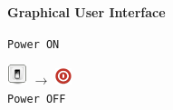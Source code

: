 \documentclass{beamer}
\begin{document}
\begin{frame}
\begin{center}
\begin{block}{\textbf{{\small Graphical User Interface}}}
\begin{minipage}{0.17\textwidth}
\begin{center}
					{\footnotesize \texttt{Power ON}}
				\end{center}
			\end{minipage}
			\hspace{0pt plus 1 filll}
			\begin{minipage}{0.23\textwidth}
				\begin{center}
					\includegraphics[scale=1]{machine_halt-22} $\rightarrow$ \includegraphics[scale=1, width=18px]{halt-22}\\
					{\footnotesize \texttt{Power OFF}}
				\end{center}
			\end{minipage}
		\end{block}
	\end{center}
\end{frame}
\end{document}
